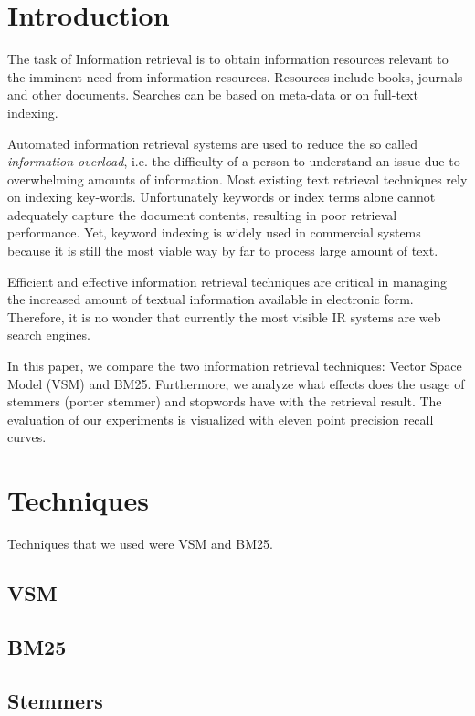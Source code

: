 \section{Introduction}

The task of Information retrieval is to obtain information resources relevant to the imminent need from information resources. Resources include books, journals and other documents. Searches can be based on meta-data or on full-text indexing.

Automated information retrieval systems are used to reduce the so called \textit{information overload}, i.e. the difficulty of a person to understand an issue due to overwhelming amounts of information. Most existing text retrieval techniques rely on indexing key-words. Unfortunately keywords or index terms alone cannot adequately capture the document contents, resulting in poor retrieval performance. Yet, keyword indexing is widely used in commercial systems because it is still the most viable way by far to process large amount of text. 

Efficient and effective information retrieval techniques are critical in managing the increased amount of textual information available in electronic form. Therefore, it is no wonder that currently the most visible IR systems are web search engines.  

In this paper, we compare the two information retrieval techniques: Vector Space Model (VSM) and BM25. Furthermore, we analyze what effects does the usage of stemmers (porter stemmer) and stopwords have with the retrieval result. The evaluation of our experiments is visualized with eleven point precision recall curves. 


\section{Techniques}

Techniques that we used were VSM and BM25. 

\subsection{VSM}
\subsection{BM25}
\subsection{Stemmers}
